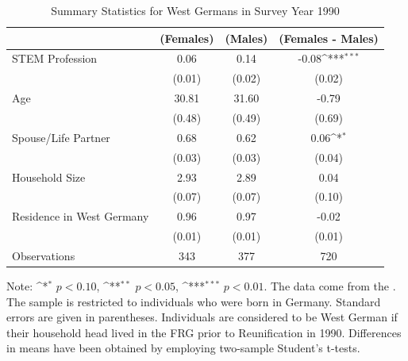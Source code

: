 \documentclass[a4paper, oneside, hyperfootnotes = false]{article}
\def\sym#1{\ifmmode^{#1}\else\(^{#1}\)\fi}
\begin{document}
{\begin{table}[ht]
    \caption{Summary Statistics for West Germans in Survey Year 1990}
    \label{tab:descr_summary_west}
    \begin{center}
        \begin{tabular}{l*{3}{c}}
        	\toprule
        	& (Females) & (Males) & (Females - Males) \\
        	\midrule
        	STEM Profession & 0.06  & 0.14 &  -0.08\sym{***}      \\
        	&   (0.01)  & (0.02) & (0.02) \\
        	\addlinespace
        	Age         & 30.81     &  31.60   &    -0.79     \\
        	&     (0.48) &        (0.49)         &      (0.69) \\
        	\addlinespace
        	Spouse/Life Partner & 0.68       &  0.62   &     0.06\sym{*}      \\
        	&      (0.03)&          (0.03)&         (0.04) \\
        	\addlinespace
        	Household Size      &  2.93   &  2.89   &    0.04       \\
        	&          (0.07)&       (0.07)        &      (0.10)\\
        	\addlinespace
        	Residence in West Germany& 0.96    &  0.97   &    -0.02        \\
        	&         (0.01) &       (0.01)&  (0.01)\\
        	\midrule
        	Observations        &        343 &     377     &       720                \\
        	\bottomrule
        \end{tabular}
        
        \vspace{2mm}
        
        \parbox{10cm}{
        \linespread{1}\footnotesize Note: \sym{*} \(p<0.10\), \sym{**} \(p<0.05\), \sym{***} \(p<0.01\). The data come from the \cite{SOEP2023}. The sample is restricted to individuals who were born in Germany. Standard errors are given in parentheses. Individuals are considered to be West German if their household head lived in the FRG prior to Reunification in 1990. Differences in means have been obtained by employing two-sample Student's t-tests.}
        
    \end{center}
\end{table}

}
\end{document}
